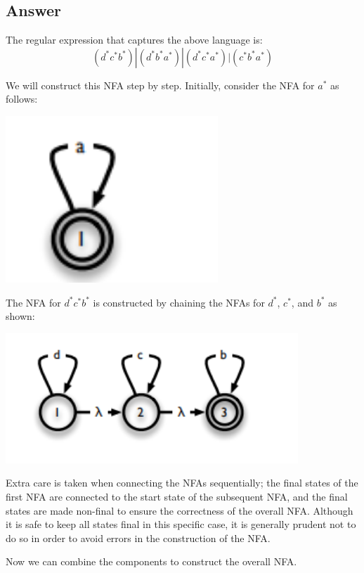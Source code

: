 \documentclass{article}
\begin{document}
\subsection*{Answer}
The regular expression that captures the above language is:
\[(d^*c^*b^*)|(d^*b^*a^*)|(d^*c^*a^*)|(c^*b^*a^*)\]

We will construct this NFA step by step. Initially, consider the NFA for \( a^* \) as follows:
\begin{center}
    \includegraphics[width=8cm]{10.png}
\end{center}


The NFA for \( d^*c^*b^* \) is constructed by chaining the NFAs for \( d^* \), \( c^* \), and \( b^* \) as shown:
\begin{center}
    \includegraphics[width=11cm]{11.png}
\end{center}


Extra care is taken when connecting the NFAs sequentially; the final states of the first NFA are connected to the start state of the subsequent NFA, and the final states are made non-final to ensure the correctness of the overall NFA. Although it is safe to keep all states final in this specific case, it is generally prudent not to do so in order to avoid errors in the construction of the NFA.

Now we can combine the components to construct the overall NFA.
\end{document}
